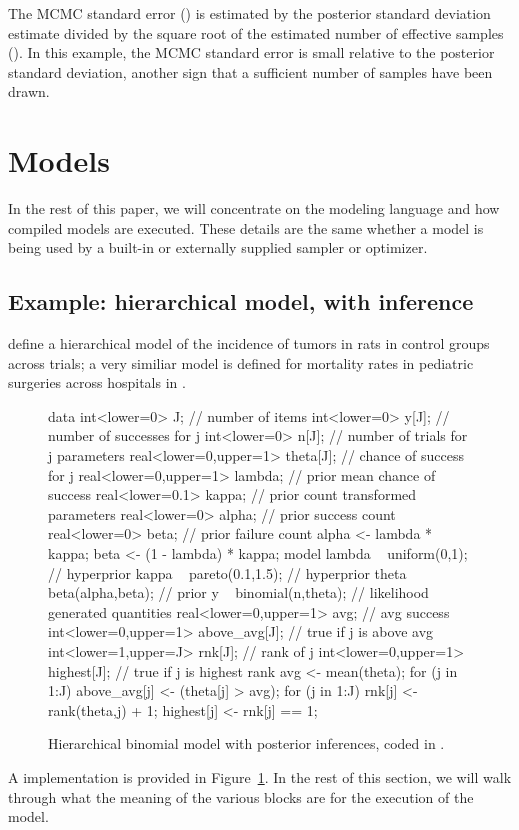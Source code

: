 \documentclass[article]{jss}
\begin{document}
The MCMC standard error () is estimated by the posterior
standard deviation estimate divided by the square root of the
estimated number of effective samples ().  In
this example, the MCMC standard error is small relative to the
posterior standard deviation, another sign that a sufficient number
of samples have been drawn.


\section{Models}

In the rest of this paper, we will concentrate on the modeling
language and how compiled models are executed.  These details are the
same whether a  model is being used by a built-in or
externally supplied sampler or optimizer.

\subsection{Example: hierarchical model, with inference}

\cite[Section 5.1]{GelmanEtAl:2013} define a hierarchical model of the
incidence of tumors in rats in control groups across trials; a very
similiar model is defined for mortality rates in pediatric surgeries
across hospitals in \citep[Examples, Volume
1]{LunnEtAl:2000,LunnEtAl:2009}.  
%  
\begin{figure}
\begin{Code}
data {
  int<lower=0> J;                         // number of items
  int<lower=0> y[J];                      // number of successes for j
  int<lower=0> n[J];                      // number of trials for j
}
parameters {
  real<lower=0,upper=1> theta[J];        // chance of success for j
  real<lower=0,upper=1> lambda;          // prior mean chance of success
  real<lower=0.1> kappa;                 // prior count
}
transformed parameters {
  real<lower=0> alpha;                   // prior success count
  real<lower=0> beta;                    // prior failure count
  alpha <- lambda * kappa;
  beta <- (1 - lambda) * kappa;
}
model {
  lambda ~ uniform(0,1);                 // hyperprior
  kappa ~ pareto(0.1,1.5);               // hyperprior 
  theta ~ beta(alpha,beta);              // prior
  y ~ binomial(n,theta);                 // likelihood
}
generated quantities {
  real<lower=0,upper=1> avg;             // avg success
  int<lower=0,upper=1> above_avg[J];     // true if j is above avg
  int<lower=1,upper=J> rnk[J];           // rank of j
  int<lower=0,upper=1> highest[J];          // true if j is highest rank
  avg <- mean(theta);
  for (j in 1:J)
    above_avg[j] <- (theta[j] > avg);
  for (j in 1:J) {
    rnk[j] <- rank(theta,j) + 1;
    highest[j] <- rnk[j] == 1;
  }
}
\end{Code}
  \caption{Hierarchical binomial model with posterior inferences,
    coded in .}\label{hier-binom.fig}
\end{figure}
%
A  implementation is provided in
Figure~\ref{hier-binom.fig}.  In the rest of this section, we will
walk through what the meaning of the various blocks are for the
execution of the model.
\end{document}
